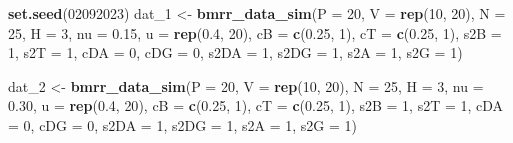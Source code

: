 \documentclass[
]{article}
\newenvironment{Shaded}{\begin{snugshade}}{\end{snugshade}}
\newcommand{\AttributeTok}[1]{\textcolor[rgb]{0.13,0.29,0.53}{#1}}
\newcommand{\DecValTok}[1]{\textcolor[rgb]{0.00,0.00,0.81}{#1}}
\newcommand{\FloatTok}[1]{\textcolor[rgb]{0.00,0.00,0.81}{#1}}
\newcommand{\FunctionTok}[1]{\textcolor[rgb]{0.13,0.29,0.53}{\textbf{#1}}}
\newcommand{\NormalTok}[1]{#1}
\newcommand{\OtherTok}[1]{\textcolor[rgb]{0.56,0.35,0.01}{#1}}
\begin{document}
\begin{Shaded}
\begin{Highlighting}[]
\FunctionTok{set.seed}\NormalTok{(}\DecValTok{02092023}\NormalTok{)}
\NormalTok{dat\_1 }\OtherTok{\textless{}{-}} \FunctionTok{bmrr\_data\_sim}\NormalTok{(}\AttributeTok{P      =} \DecValTok{20}\NormalTok{,}
                       \AttributeTok{V      =} \FunctionTok{rep}\NormalTok{(}\DecValTok{10}\NormalTok{, }\DecValTok{20}\NormalTok{),}
                       \AttributeTok{N      =} \DecValTok{25}\NormalTok{,}
                       \AttributeTok{H      =} \DecValTok{3}\NormalTok{,}
                       \AttributeTok{nu     =} \FloatTok{0.15}\NormalTok{,}
                       \AttributeTok{u      =} \FunctionTok{rep}\NormalTok{(}\FloatTok{0.4}\NormalTok{, }\DecValTok{20}\NormalTok{),}
                       \AttributeTok{cB     =} \FunctionTok{c}\NormalTok{(}\FloatTok{0.25}\NormalTok{, }\DecValTok{1}\NormalTok{),}
                       \AttributeTok{cT     =} \FunctionTok{c}\NormalTok{(}\FloatTok{0.25}\NormalTok{, }\DecValTok{1}\NormalTok{),}
                       \AttributeTok{s2B    =} \DecValTok{1}\NormalTok{,}
                       \AttributeTok{s2T    =} \DecValTok{1}\NormalTok{,}
                       \AttributeTok{cDA    =} \DecValTok{0}\NormalTok{,}
                       \AttributeTok{cDG    =} \DecValTok{0}\NormalTok{,}
                       \AttributeTok{s2DA   =} \DecValTok{1}\NormalTok{,}
                       \AttributeTok{s2DG   =} \DecValTok{1}\NormalTok{,}
                       \AttributeTok{s2A    =} \DecValTok{1}\NormalTok{,}
                       \AttributeTok{s2G    =} \DecValTok{1}\NormalTok{)}

\NormalTok{dat\_2 }\OtherTok{\textless{}{-}} \FunctionTok{bmrr\_data\_sim}\NormalTok{(}\AttributeTok{P      =} \DecValTok{20}\NormalTok{,}
                       \AttributeTok{V      =} \FunctionTok{rep}\NormalTok{(}\DecValTok{10}\NormalTok{, }\DecValTok{20}\NormalTok{),}
                       \AttributeTok{N      =} \DecValTok{25}\NormalTok{,}
                       \AttributeTok{H      =} \DecValTok{3}\NormalTok{,}
                       \AttributeTok{nu     =} \FloatTok{0.30}\NormalTok{,}
                       \AttributeTok{u      =} \FunctionTok{rep}\NormalTok{(}\FloatTok{0.4}\NormalTok{, }\DecValTok{20}\NormalTok{),}
                       \AttributeTok{cB     =} \FunctionTok{c}\NormalTok{(}\FloatTok{0.25}\NormalTok{, }\DecValTok{1}\NormalTok{),}
                       \AttributeTok{cT     =} \FunctionTok{c}\NormalTok{(}\FloatTok{0.25}\NormalTok{, }\DecValTok{1}\NormalTok{),}
                       \AttributeTok{s2B    =} \DecValTok{1}\NormalTok{,}
                       \AttributeTok{s2T    =} \DecValTok{1}\NormalTok{,}
                       \AttributeTok{cDA    =} \DecValTok{0}\NormalTok{,}
                       \AttributeTok{cDG    =} \DecValTok{0}\NormalTok{,}
                       \AttributeTok{s2DA   =} \DecValTok{1}\NormalTok{,}
                       \AttributeTok{s2DG   =} \DecValTok{1}\NormalTok{,}
                       \AttributeTok{s2A    =} \DecValTok{1}\NormalTok{,}
                       \AttributeTok{s2G    =} \DecValTok{1}\NormalTok{)}


\end{Highlighting}
\end{Shaded}
\end{document}
